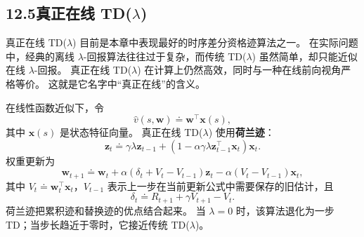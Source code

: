 \documentclass[UTF8, 12pt, fontset=fandol, oneside]{ctexart}
\begin{document}
\subsection*{12.5\quad 真正在线 TD($\lambda$)}

真正在线 TD($\lambda$) 目前是本章中表现最好的时序差分资格迹算法之一。
在实际问题中，经典的离线 $\lambda$-回报算法往往过于复杂，而传统 TD($\lambda$) 虽然简单，却只能近似在线 $\lambda$-回报。
真正在线 TD($\lambda$) 在计算上仍然高效，同时与一种在线前向视角严格等价。
这就是它名字中“真正在线”的含义。

在线性函数近似下，令
\[
\hat v(s,\mathbf{w})\doteq \mathbf{w}^{\top}\mathbf{x}(s),
\]
其中 $\mathbf{x}(s)$ 是状态特征向量。
真正在线 TD($\lambda$) 使用\textbf{荷兰迹}：
\begin{equation}
\mathbf{z}_t\doteq \gamma\lambda\mathbf{z}_{t-1}
+\left(1-\alpha\gamma\lambda\mathbf{z}_{t-1}^{\top}\mathbf{x}_t\right)\mathbf{x}_t.
\tag{12.9}
\end{equation}
权重更新为
\begin{equation}
\mathbf{w}_{t+1}\doteq \mathbf{w}_t+\alpha(\delta_t+V_t-V_{t-1})\mathbf{z}_t
-\alpha(V_t-V_{t-1})\mathbf{x}_t,
\tag{12.10}
\end{equation}
其中 $V_t\doteq\mathbf{w}_t^\top\mathbf{x}_t$，$V_{t-1}$ 表示上一步在当前更新公式中需要保存的旧估计，且
\[
\delta_t\doteq R_{t+1}+\gamma V_{t+1}-V_t.
\]
荷兰迹把累积迹和替换迹的优点结合起来。
当 $\lambda=0$ 时，该算法退化为一步 TD；当步长趋近于零时，它接近传统 TD($\lambda$)。
\end{document}

